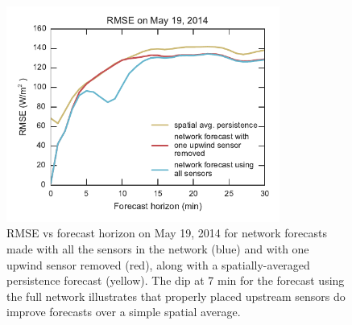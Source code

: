 \begin{figure}[htbp]
 \centering
 \includegraphics[width=0.8\textwidth]{figs/missing.pdf}
 \caption[Example of a sensor's influence on network forecasts]{RMSE
   vs forecast horizon on May 19, 2014 for network forecasts made with
   all the sensors in the network (blue) and with one upwind sensor
   removed (red), along with a spatially-averaged persistence forecast
   (yellow). The dip at 7 min for the forecast using the full network
   illustrates that properly placed upstream sensors do improve
   forecasts over a simple spatial average.
}
\label{fig:circuitbreak}
\end{figure}


